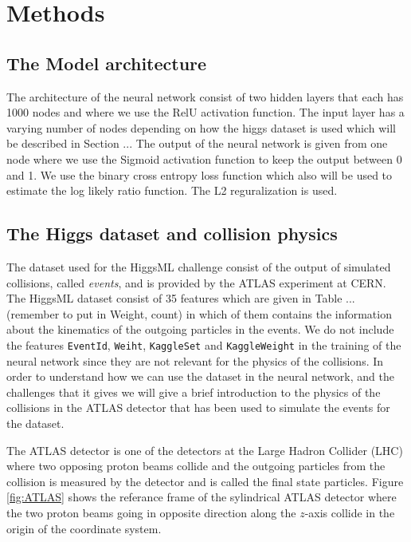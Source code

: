 \documentclass[../../main/main.tex]{subfiles}
\begin{document}
\section{Methods}
\label{sec:methods}


\subsection{ The Model architecture}
\label{sec:model-architecture}

The architecture of the neural network consist of two hidden layers that each has 1000 nodes and where we use the RelU activation function. The input layer has a varying number of nodes depending on how the higgs dataset is used which will be described in Section ... The output of the neural network is given from one node where we use the Sigmoid activation function to keep the output between 0 and 1. We use the binary cross entropy loss function which also will be used to estimate the log likely ratio function. The L2 reguralization is used.
\subsection{The Higgs dataset and collision physics}
\label{sec:higgs-dataset}

The dataset used for the HiggsML challenge consist of the output of simulated collisions, called \emph{events}, and is provided by the ATLAS experiment at CERN. The HiggsML dataset consist of 35 features which are given in Table ... (remember to put in Weight, count) in which of them contains the information about the kinematics of the outgoing particles in the events. We do not include the features \texttt{EventId}, \texttt{Weiht}, \texttt{KaggleSet} and \texttt{KaggleWeight} in the training of the neural network since they are not relevant for the physics of the collisions. In order to understand how we can use the dataset in the neural network, and the challenges that it gives we will give a brief introduction to the physics of the collisions in the ATLAS detector that has been used to simulate the events for the dataset.

The ATLAS detector is one of the detectors at the Large Hadron Collider (LHC) where two opposing proton beams collide and the outgoing particles from the collision is measured by the detector and is called the final state particles. Figure \ref{fig:ATLAS} shows the referance frame of the sylindrical ATLAS detector where the two proton beams going in opposite direction along the \(z\)-axis collide in the origin of the coordinate system.
\end{document}
